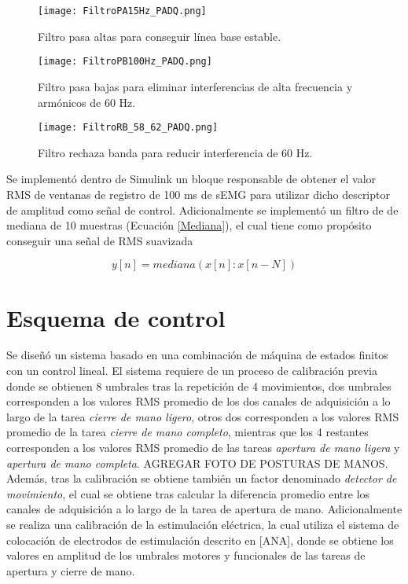 \begin{figure}[htbp]
	\centering
	\texttt{[image: FiltroPA15Hz\_PADQ.png]}
	\caption{Filtro pasa altas para conseguir línea base estable.}
	\label{Figura: FiltroPA}
	
	\texttt{[image: FiltroPB100Hz\_PADQ.png]}
	\caption{Filtro pasa bajas para eliminar interferencias de alta frecuencia y armónicos de 60 Hz.} 
	\label{Figura: FiltroPB}
	
	\texttt{[image: FiltroRB\_58\_62\_PADQ.png]}
	\caption{Filtro rechaza banda para reducir interferencia de 60 Hz.}
	\label{Figura: FiltroRB}
\end{figure}

Se implementó dentro de Simulink un bloque responsable de obtener el valor RMS de ventanas de registro de 100 ms de sEMG para utilizar dicho descriptor de amplitud como señal de control. Adicionalmente se implementó un filtro de de mediana de 10 muestras (Ecuación \ref{Mediana}), el cual tiene como propósito conseguir una señal de RMS suavizada

\begin{equation}
	y[n] = mediana(x[n]:x[n-N])
	\label{Mediana}
\end{equation}

\newpage
\section{Esquema de control}
Se diseñó un sistema basado en una combinación de máquina de estados finitos con un control lineal. El sistema requiere de un proceso de calibración previa donde se obtienen 8 umbrales tras la repetición de 4 movimientos, dos umbrales corresponden a los valores RMS promedio de los dos canales de adquisición a lo largo de la tarea \emph{cierre de mano ligero}, otros dos corresponden a los valores RMS promedio de la tarea \emph{cierre de mano completo}, mientras que los 4 restantes corresponden a los valores RMS promedio de las tareas \emph{apertura de mano ligera} y \emph{apertura de mano completa}. {\color{red}AGREGAR FOTO DE POSTURAS DE MANOS}. Además, tras la calibración se obtiene también un factor denominado \emph{detector de movimiento}, el cual se obtiene tras calcular la diferencia promedio entre los canales de adquisición a lo largo de la tarea de apertura de mano. Adicionalmente se realiza una calibración de la estimulación eléctrica, la cual utiliza el sistema de colocación de electrodos de estimulación descrito en [{\color {red}ANA}], donde se obtiene los valores en amplitud de los umbrales motores y funcionales de las tareas de apertura y cierre de mano.


